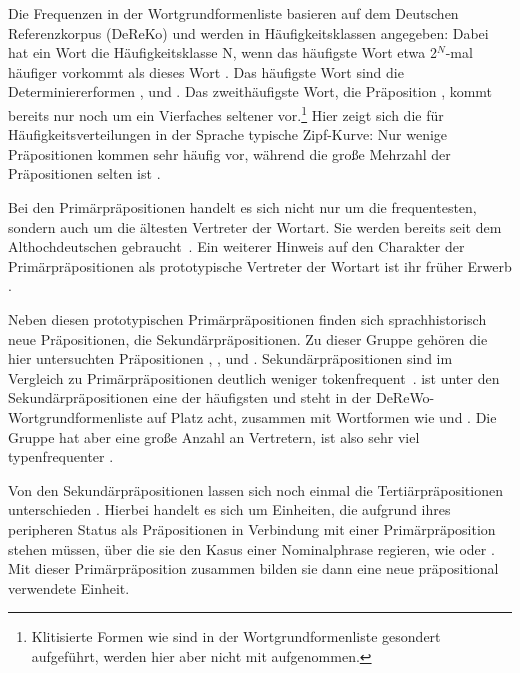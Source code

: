 Die Frequenzen in der Wortgrundformenliste basieren auf dem Deutschen Referenzkorpus (DeReKo) und werden in Häufigkeitsklassen angegeben: \glqq Dabei hat ein Wort die
Häufigkeitsklasse N, wenn das häufigste Wort etwa 2$^{N}$-mal häufiger vorkommt als dieses Wort\grqq{} \citep[13]{InstitutfurDeutscheSprache2012}. 
Das häufigste Wort sind die Determiniererformen ,  und . 
Das zweithäufigste Wort, die Präposition , kommt bereits nur noch um ein Vierfaches seltener vor.\footnote{Klitisierte Formen wie  sind in der Wortgrundformenliste gesondert aufgeführt, werden hier aber nicht mit aufgenommen.} 
Hier zeigt sich die für Häufigkeitsverteilungen in der Sprache typische Zipf-Kurve: Nur wenige Präpositionen kommen sehr häufig vor, während die große Mehrzahl der Präpositionen selten ist \citep[s.][22--27]{Zipf.1972}.

Bei den Primärpräpositionen handelt es sich nicht nur um die frequentesten, sondern auch um die ältesten Vertreter der Wortart. 
Sie werden bereits seit dem Althochdeutschen gebraucht~\citep[s.][1]{Graff.1824}.
Ein weiterer Hinweis auf den Charakter der Primärpräpositionen als prototypische Vertreter der Wortart ist ihr früher Erwerb \citep[s.][203--206]{Becker2011}. 

\begin{sloppypar}
Neben diesen prototypischen Primärpräpositionen finden sich sprachhistorisch neue Präpositionen, die Sekundärpräpositionen.
Zu dieser Gruppe gehören die hier untersuchten Präpositionen , ,  und . 
Sekund{\"a}rpr{\"a}positionen sind im Vergleich zu Prim{\"a}rpr{\"a}positionen deutlich weniger tokenfrequent~\citep[636--637]{Griehaber2009}.
 ist unter den Sekundärpräpositionen eine der häufigsten und steht in der DeReWo-Wortgrundformenliste auf Platz acht, zusammen mit Wortformen wie  und  \citep[s.][]{InstitutfurDeutscheSprache2012}. 
Die Gruppe hat aber eine große Anzahl an Vertretern, ist also sehr viel typenfrequenter \citep[s.][93]{Szczepaniak2011}.
\end{sloppypar}

Von den Sekundärpräpositionen lassen sich noch einmal die Tertiärpräpositionen unterschieden \citep[s.][631]{Griehaber2009}. 
Hierbei handelt es sich um Einheiten, die aufgrund ihres peripheren Status als Präpositionen in Verbindung mit einer Primärpräposition stehen müssen, über die sie den Kasus einer Nominalphrase regieren, wie  oder . 
Mit dieser Primärpräposition zusammen bilden sie dann eine neue präpositional verwendete Einheit.\largerpage[1.5]


